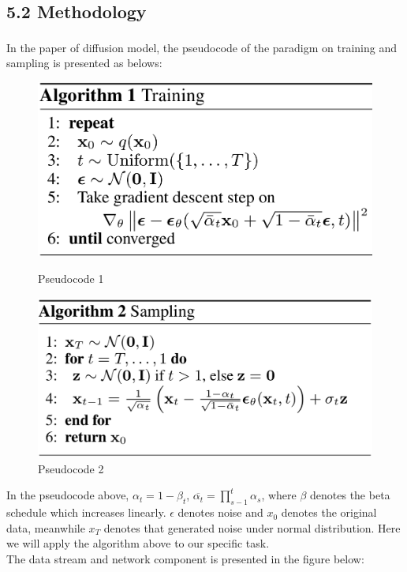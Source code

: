 \documentclass[11pt]{article}
\begin{document}
    \subsection*{5.2 Methodology}\label{methodology}

In the paper of diffusion model\textsuperscript{\cite{diffusion}}, the pseudocode of the paradigm
on training and sampling is presented as belows:

\begin{figure}[H]
    \centering
    \begin{minipage}{0.45\textwidth}
        \centering
        \includegraphics[width=\textwidth]{image/pseudo1.png}
        \caption{Pseudocode 1}
    \end{minipage}
    \hfill
    \begin{minipage}{0.5\textwidth}
        \centering
        \includegraphics[width=\textwidth]{image/pseudo2.png}
        \caption{Pseudocode 2}
    \end{minipage}
\end{figure}

In the pseudocode above, \(\alpha_t = 1-\beta_t\),
\(\overline{\alpha_t} = \prod_{s-1}^t \alpha_s\), where \(\beta\)
denotes the beta schedule which increases linearly. \(\epsilon\) denotes
noise and \(x_0\) denotes the original data, meanwhile \(x_T\) denotes
that generated noise under normal distribution. Here we will apply the
algorithm above to our specific task.\\
The data stream and network component is presented in the figure below:
\end{document}
